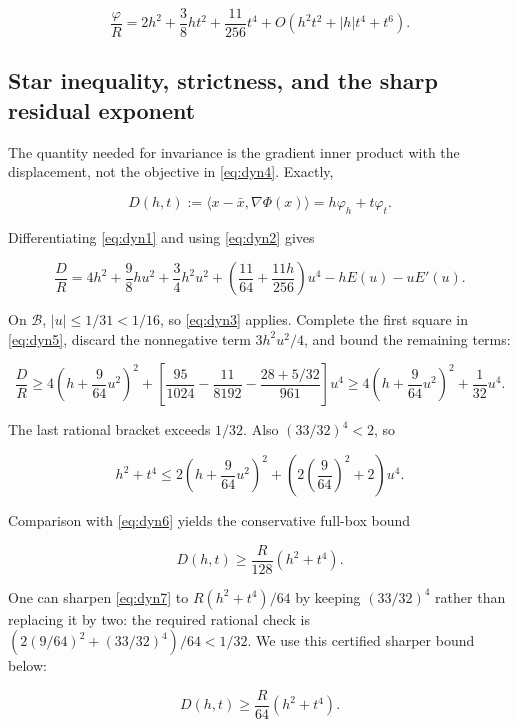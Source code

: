 \documentclass[11pt]{article}
\theoremstyle{remark}\newtheorem{remark}[theorem]{Remark}
\begin{document}
\begin{equation}
\frac{\varphi}R=2h^2+\frac38ht^2+\frac{11}{256}t^4
+O(h^2t^2+|h|t^4+t^6). \label{eq:dyn4}
\end{equation}

\subsection{Star inequality, strictness, and the sharp residual exponent}

The quantity needed for invariance is the gradient inner product with the displacement, not the objective in \eqref{eq:dyn4}. Exactly,

\[
D(h,t):=\langle x-\bar x,\nabla\Phi(x)\rangle
=h\varphi_h+t\varphi_t.
\]

Differentiating \eqref{eq:dyn1} and using \eqref{eq:dyn2} gives

\begin{equation}
\frac DR=4h^2+\frac98hu^2+\frac34h^2u^2
+\left(\frac{11}{64}+\frac{11h}{256}\right)u^4-hE(u)-uE'(u).
\label{eq:dyn5}
\end{equation}

On \(\mathcal B\), \(|u|\le1/31<1/16\), so \eqref{eq:dyn3} applies. Complete the first square in \eqref{eq:dyn5}, discard the nonnegative term \(3h^2u^2/4\), and bound the remaining terms:

\begin{equation}
\frac DR\ge4\left(h+\frac9{64}u^2\right)^2+
\left[\frac{95}{1024}-\frac{11}{8192}
-\frac{28+5/32}{961}\right]u^4
\ge4\left(h+\frac9{64}u^2\right)^2+\frac1{32}u^4.
\label{eq:dyn6}
\end{equation}

The last rational bracket exceeds \(1/32\). Also \((33/32)^4<2\), so

\[
h^2+t^4\le2\left(h+\frac9{64}u^2\right)^2+
\left(2\left(\frac9{64}\right)^2+2\right)u^4.
\]

Comparison with \eqref{eq:dyn6} yields the conservative full-box bound

\begin{equation}
\boxed{D(h,t)\ge\frac R{128}(h^2+t^4).} \label{eq:dyn7}
\end{equation}

One can sharpen \eqref{eq:dyn7} to \(R(h^2+t^4)/64\) by keeping \((33/32)^4\) rather than replacing it by two: the required rational check is
\((2(9/64)^2+(33/32)^4)/64<1/32\). We use this certified sharper bound below:

\begin{equation}
D(h,t)\ge\frac R{64}(h^2+t^4). \label{eq:dyn8}
\end{equation}
\end{document}
